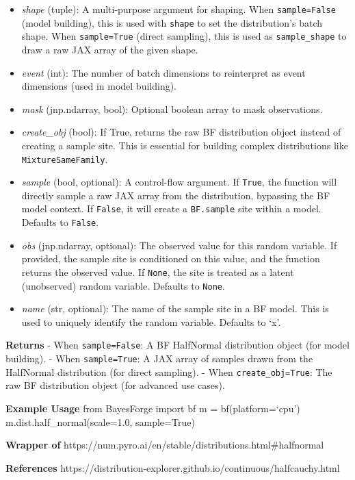 \documentclass[
  letterpaper,
  DIV=11,
  numbers=noendperiod]{scrartcl}
\begin{document}
\begin{itemize}
\item
  \emph{shape} (tuple): A multi-purpose argument for shaping. When
  \texttt{sample=False} (model building), this is used with
  \texttt{shape} to set the distribution's batch shape. When
  \texttt{sample=True} (direct sampling), this is used as
  \texttt{sample\_shape} to draw a raw JAX array of the given shape.
\item
  \emph{event} (int): The number of batch dimensions to reinterpret as
  event dimensions (used in model building).
\item
  \emph{mask} (jnp.ndarray, bool): Optional boolean array to mask
  observations.
\item
  \emph{create\_obj} (bool): If True, returns the raw BF distribution
  object instead of creating a sample site. This is essential for
  building complex distributions like \texttt{MixtureSameFamily}.
\item
  \emph{sample} (bool, optional): A control-flow argument. If
  \texttt{True}, the function will directly sample a raw JAX array from
  the distribution, bypassing the BF model context. If \texttt{False},
  it will create a \texttt{BF.sample} site within a model. Defaults to
  \texttt{False}.
\item
  \emph{obs} (jnp.ndarray, optional): The observed value for this random
  variable. If provided, the sample site is conditioned on this value,
  and the function returns the observed value. If \texttt{None}, the
  site is treated as a latent (unobserved) random variable. Defaults to
  \texttt{None}.
\item
  \emph{name} (str, optional): The name of the sample site in a BF
  model. This is used to uniquely identify the random variable. Defaults
  to `x'.
\end{itemize}

\textbf{Returns} - When \texttt{sample=False}: A BF HalfNormal
distribution object (for model building). - When \texttt{sample=True}: A
JAX array of samples drawn from the HalfNormal distribution (for direct
sampling). - When \texttt{create\_obj=True}: The raw BF distribution
object (for advanced use cases).

\textbf{Example Usage} from BayesForge import bf m = bf(platform=`cpu')
m.dist.half\_normal(scale=1.0, sample=True)

\textbf{Wrapper of}
https://num.pyro.ai/en/stable/distributions.html\#halfnormal

\textbf{References}
https://distribution-explorer.github.io/continuous/halfcauchy.html
\end{document}
